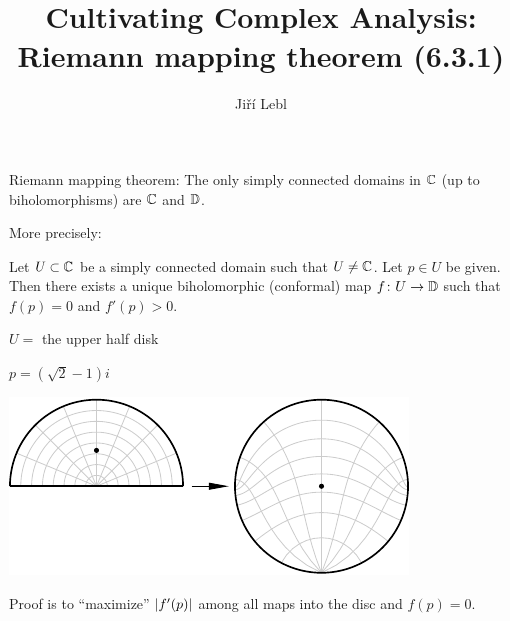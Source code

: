 \documentclass[10pt,aspectratio=169]{beamer}
\author{Ji\v{r}\'i Lebl}
\institute[OSU]{%
Departemento pri Matematiko de Oklahoma {\^S}tata Universitato}
\title{Cultivating Complex Analysis:\\%
Riemann mapping theorem (6.3.1)}
\date{}
\begin{document}
\begin{frame}
\titlepage
\end{frame}

\begin{frame}
Riemann mapping theorem: The only simply connected domains in
${\mathbb{C}}$ (up to biholomorphisms) are ${\mathbb{C}}$ and ${\mathbb{D}}$.

\pause
\medskip

More precisely:

\begin{theorem}
Let $U \subset {\mathbb{C}}$ be a simply connected domain such that $U \not= {\mathbb{C}}$.
Let $p \in U$ be given.  Then there exists a unique biholomorphic (conformal)
map $f \colon U \to {\mathbb{D}}$ such that $f(p) = 0$ and
$f'(p) > 0$.
\end{theorem}

\medskip
\pause

$U={}$ the upper half disk

$p=(\sqrt{2}-1)i$

\vspace*{-\baselineskip}

\hspace*{1in}
\includegraphics{../figures/riemannmap}

\pause

Proof is to ``maximize'' $\lvert {f'(p)} \rvert$ among all maps into the disc and $f(p)=0$.


\end{frame}
\end{document}
